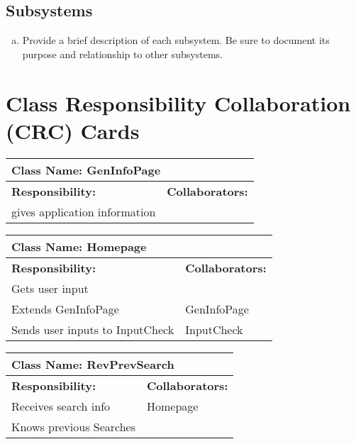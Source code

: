 \documentclass[]{article}
\begin{document}
\subsection{Subsystems}
\label{sub:subsystems}
\begin{enumerate}[a)]
	\item Provide a brief description of each subsystem. Be sure to document its purpose and relationship to other subsystems.
\end{enumerate}

	
\section{Class Responsibility Collaboration (CRC) Cards}
\label{sec:class_responsibility_collaboration_crc_cards}

\begin{table}[ht]
		\centering
		\begin{tabular}{|p{5cm}|p{5cm}|}
			\hline 
			\multicolumn{2}{|l|}{\textbf{Class Name: GenInfoPage}} \\
			\hline
			\textbf{Responsibility:} & \textbf{Collaborators:} \\
			\hline
			gives application information &  \\
			\hline
		\end{tabular}
	\end{table}	
	
\begin{table}[ht]
		\centering
		\begin{tabular}{|p{5cm}|p{5cm}|}
			\hline 
			\multicolumn{2}{|l|}{\textbf{Class Name: Homepage}} \\
			\hline
			\textbf{Responsibility:} & \textbf{Collaborators:} \\
			\hline
			Gets user input  & \\
			\hline
			Extends GenInfoPage & GenInfoPage\\
			\hline
			Sends user inputs to InputCheck & InputCheck\\
			\hline
		\end{tabular}
	\end{table}	

\begin{table}[ht]
		\centering
		\begin{tabular}{|p{5cm}|p{5cm}|}
			\hline 
			\multicolumn{2}{|l|}{\textbf{Class Name: RevPrevSearch}} \\
			\hline
			\textbf{Responsibility:} & \textbf{Collaborators:} \\
			\hline
			Receives search info & Homepage\\
			\hline
			Knows previous Searches & \\
			\hline
		\end{tabular}
	\end{table}	
\end{document}
